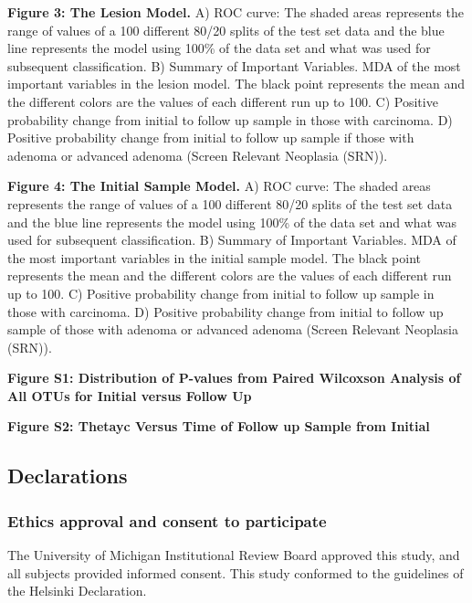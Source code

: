 \documentclass[12pt,]{article}
\begin{document}
\textbf{Figure 3: The Lesion Model.} A) ROC curve: The shaded areas
represents the range of values of a 100 different 80/20 splits of the
test set data and the blue line represents the model using 100\% of the
data set and what was used for subsequent classification. B) Summary of
Important Variables. MDA of the most important variables in the lesion
model. The black point represents the mean and the different colors are
the values of each different run up to 100. C) Positive probability
change from initial to follow up sample in those with carcinoma. D)
Positive probability change from initial to follow up sample if those
with adenoma or advanced adenoma (Screen Relevant Neoplasia (SRN)).

\textbf{Figure 4: The Initial Sample Model.} A) ROC curve: The shaded
areas represents the range of values of a 100 different 80/20 splits of
the test set data and the blue line represents the model using 100\% of
the data set and what was used for subsequent classification. B) Summary
of Important Variables. MDA of the most important variables in the
initial sample model. The black point represents the mean and the
different colors are the values of each different run up to 100. C)
Positive probability change from initial to follow up sample in those
with carcinoma. D) Positive probability change from initial to follow up
sample of those with adenoma or advanced adenoma (Screen Relevant
Neoplasia (SRN)).

\newpage

\textbf{Figure S1: Distribution of P-values from Paired Wilcoxson
Analysis of All OTUs for Initial versus Follow Up}

\textbf{Figure S2: Thetayc Versus Time of Follow up Sample from Initial}

\newpage

\subsection{Declarations}\label{declarations}

\subsubsection{Ethics approval and consent to
participate}\label{ethics-approval-and-consent-to-participate}

The University of Michigan Institutional Review Board approved this
study, and all subjects provided informed consent. This study conformed
to the guidelines of the Helsinki Declaration.
\end{document}

